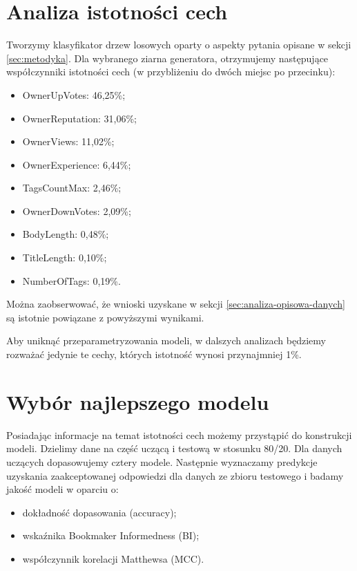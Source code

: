 \documentclass[12pt]{article}
\begin{document}
	\section{Analiza istotności cech}\label{sec:analiza-istotnosci-cech}
	Tworzymy klasyfikator drzew losowych oparty o aspekty pytania opisane w sekcji \ref{sec:metodyka}. Dla wybranego ziarna generatora, otrzymujemy następujące współczynniki istotności cech (w przybliżeniu do dwóch miejsc po przecinku):
	\begin{itemize}
		\item OwnerUpVotes: 46,25\%;
		\item OwnerReputation: 31,06\%;
		\item OwnerViews: 11,02\%;
		\item OwnerExperience: 6,44\%;
		\item TagsCountMax: 2,46\%;
		\item OwnerDownVotes: 2,09\%;
		\item BodyLength: 0,48\%;
		\item TitleLength: 0,10\%;
		\item NumberOfTags: 0,19\%.
	\end{itemize}
	Można zaobserwować, że wnioski uzyskane w sekcji \ref{sec:analiza-opisowa-danych} są istotnie powiązane z powyższymi wynikami.
	
	\vspace{0.25cm}
	
	Aby uniknąć przeparametryzowania modeli, w dalszych analizach będziemy rozważać jedynie te cechy, których istotność wynosi przynajmniej 1\%.
	
	\section{Wybór najlepszego modelu}\label{sec:wybor-najlepszego-modelu}
	Posiadając informacje na temat istotności cech możemy przystąpić do konstrukcji modeli. Dzielimy dane na część uczącą i testową w stosunku 80/20. Dla danych uczących dopasowujemy cztery modele. Następnie wyznaczamy predykcje uzyskania zaakceptowanej odpowiedzi dla danych ze zbioru testowego i badamy jakość modeli w oparciu o: 
	\begin{itemize}
		\item dokładność dopasowania (accuracy);
		\item wskaźnika Bookmaker Informedness (BI);
		\item współczynnik korelacji Matthewsa (MCC). 
	\end{itemize}
	
\end{document}
